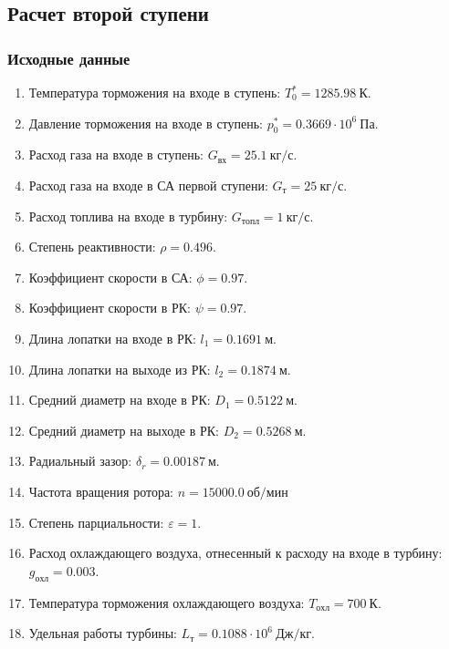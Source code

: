 \documentclass[a4paper,10pt]{article}
\begin{document}
    \subsection{Расчет второй ступени}

    \subsubsection{Исходные данные}

    
    \begin{enumerate}

        \item Температура торможения на входе в ступень: $T_0^* = 1285.98\ К $.
        \item Давление торможения на входе в ступень: $p_0^* = 0.3669 \cdot 10^6 \ Па$.
        \item Расход газа на входе в ступень: $G_{вх} = 25.1\ кг/с$.
        \item Расход газа на входе в СА первой ступени: $ G_т = 25\ кг/с $.
        \item Расход топлива на входе в турбину: $ G_{топл} = 1\ кг/с $.
        \item Степень реактивности: $ \rho = 0.496 $.
        \item Коэффициент скорости в СА: $ \phi = 0.97 $.
        \item Коэффициент скорости в РК: $ \psi = 0.97 $.
        \item Длина лопатки на входе в РК: $ l_1 = 0.1691\ м $.
        \item Длина лопатки на выходе из РК: $ l_2 = 0.1874\ м $.
        \item Средний диаметр на входе в РК: $ D_1 = 0.5122\ м $.
        \item Средний диаметр на выходе в РК: $ D_2 = 0.5268\ м $.
        \item Радиальный зазор: $ \delta_r = 0.00187\ м $.
        \item Частота вращения ротора: $ n = 15000.0\ об/мин $
        \item Степень парциальности: $ \varepsilon = 1 $.
        \item Расход охлаждающего воздуха, отнесенный к расходу на входе в турбину: $ g_{охл} = 0.003 $.
        \item Температура торможения охлаждающего воздуха: $ T_{охл} = 700\ К $.

        
        \item Удельная работы турбины: $ L_т = 0.1088 \cdot 10^6 \ Дж/кг $.

        

    \end{enumerate}
    
\end{document}
